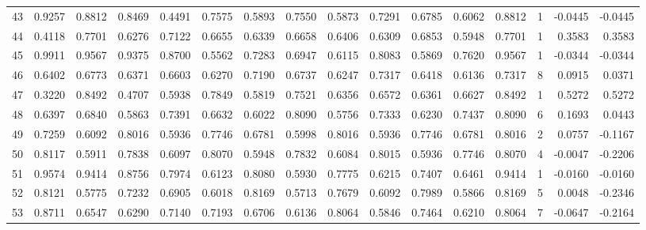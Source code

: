 \begin{tabular}{lrrrrrrrrrrrrrrr}
43  &      0.9257 &  0.8812 &  0.8469 &  0.4491 &  0.7575 &  0.5893 &  0.7550 &  0.5873 &  0.7291 &  0.6785 &   0.6062 &     0.8812 &      1 &                   -0.0445 &                    -0.0445 \\
44  &      0.4118 &  0.7701 &  0.6276 &  0.7122 &  0.6655 &  0.6339 &  0.6658 &  0.6406 &  0.6309 &  0.6853 &   0.5948 &     0.7701 &      1 &                    0.3583 &                     0.3583 \\
45  &      0.9911 &  0.9567 &  0.9375 &  0.8700 &  0.5562 &  0.7283 &  0.6947 &  0.6115 &  0.8083 &  0.5869 &   0.7620 &     0.9567 &      1 &                   -0.0344 &                    -0.0344 \\
46  &      0.6402 &  0.6773 &  0.6371 &  0.6603 &  0.6270 &  0.7190 &  0.6737 &  0.6247 &  0.7317 &  0.6418 &   0.6136 &     0.7317 &      8 &                    0.0915 &                     0.0371 \\
47  &      0.3220 &  0.8492 &  0.4707 &  0.5938 &  0.7849 &  0.5819 &  0.7521 &  0.6356 &  0.6572 &  0.6361 &   0.6627 &     0.8492 &      1 &                    0.5272 &                     0.5272 \\
48  &      0.6397 &  0.6840 &  0.5863 &  0.7391 &  0.6632 &  0.6022 &  0.8090 &  0.5756 &  0.7333 &  0.6230 &   0.7437 &     0.8090 &      6 &                    0.1693 &                     0.0443 \\
49  &      0.7259 &  0.6092 &  0.8016 &  0.5936 &  0.7746 &  0.6781 &  0.5998 &  0.8016 &  0.5936 &  0.7746 &   0.6781 &     0.8016 &      2 &                    0.0757 &                    -0.1167 \\
50  &      0.8117 &  0.5911 &  0.7838 &  0.6097 &  0.8070 &  0.5948 &  0.7832 &  0.6084 &  0.8015 &  0.5936 &   0.7746 &     0.8070 &      4 &                   -0.0047 &                    -0.2206 \\
51  &      0.9574 &  0.9414 &  0.8756 &  0.7974 &  0.6123 &  0.8080 &  0.5930 &  0.7775 &  0.6215 &  0.7407 &   0.6461 &     0.9414 &      1 &                   -0.0160 &                    -0.0160 \\
52  &      0.8121 &  0.5775 &  0.7232 &  0.6905 &  0.6018 &  0.8169 &  0.5713 &  0.7679 &  0.6092 &  0.7989 &   0.5866 &     0.8169 &      5 &                    0.0048 &                    -0.2346 \\
53  &      0.8711 &  0.6547 &  0.6290 &  0.7140 &  0.7193 &  0.6706 &  0.6136 &  0.8064 &  0.5846 &  0.7464 &   0.6210 &     0.8064 &      7 &                   -0.0647 &                    -0.2164 \\

\end{tabular}
